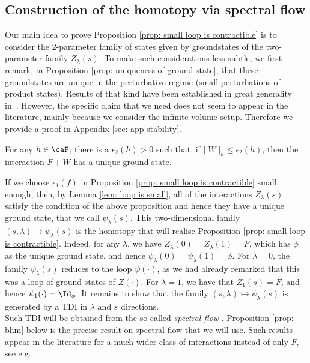 \subsection{Construction of the homotopy via spectral flow}\label{sec: homotopy from spectral flow}

Our main idea to prove Proposition \ref{prop: small loop is contractible} is to consider the 2-parameter family of states given by  groundstates of the two-parameter family $Z_\lambda(s)$. To make such considerations less subtle, we first remark, in Proposition \ref{prop: uniqueness of ground state}, that these groundstates are unique in the perturbative regime (small perturbations of product states). Results of that kind have been established in great generality in~\cite{yarotsky2006ground,bravyi2010topological,michalakis2013stability,nachtergaele2020quasi}.  However, the specific claim that we need does not seem to appear in the literature, mainly because we consider the infinite-volume setup. Therefore we provide a proof in Appendix \ref{sec: app stability}.  
\begin{proposition}\label{prop: uniqueness of ground state}
	For any $h\in\caF$, there is a $\epsilon_2(h)>0$ such that, if $||W||_h \leq \epsilon_2(h)$, then 
	the interaction $F+W$ has a unique ground state. 
\end{proposition} 
If we choose $\epsilon_1(f)$ in Proposition \ref{prop: small loop is contractible} small enough, then, by Lemma \ref{lem: loop is small}, all of the 
interactions $Z_{\lambda}(s)$ satisfy the condition of the above proposition and hence they have a unique ground state, that we call $\psi_\lambda(s)$. This two-dimensional family  $(s,\lambda)\mapsto \psi_\lambda(s)$ is the  homotopy that will realise Proposition \ref{prop: small loop is contractible}. Indeed, for any $\lambda$, we have $Z_{\lambda}(0)=Z_{\lambda}(1)=F$, which has $\phi$ as the unique ground state, and hence $\psi_\lambda(0)=\psi_\lambda(1)=\phi$. 
For $\lambda=0$, the family $\psi_\lambda(s)$ reduces to the loop $\psi(\cdot)$, as we had already remarked that this was a loop of ground states of $Z(\cdot)$.
For $\lambda=1$, we have that $Z_1(s)=F$, and hence $\psi_1(\cdot)=\Id_\phi$. It remains to show that the family $(s,\lambda)\mapsto \psi_\lambda(s)$ is generated by a TDI in $\lambda$ and $s$ directions.\\ Such TDI will be obtained from the so-called \emph{spectral flow} \cite{hastings2005quasiadiabatic,bachmann2012automorphic,moon2020automorphic}. Proposition \ref{prop: bhm} below is the precise result on spectral flow that we will use.  Such results appear in the literature for a much wider class of interactions instead of only $F$, see e.g.\ 
